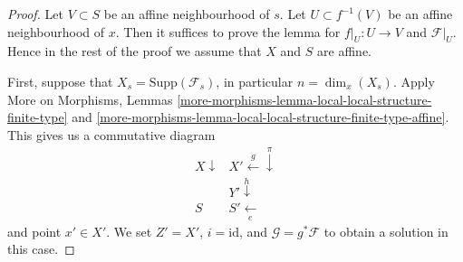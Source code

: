 \begin{proof}

Let $V \subset S$ be an affine neighbourhood of $s$.
Let $U \subset f^{-1}(V)$ be an affine neighbourhood of $x$.
Then it suffices to prove the lemma for $f|_U : U \to V$ and
$\mathcal{F}|_U$. Hence in the rest of the proof we assume that
$X$ and $S$ are affine.

\medskip\noindent
First, suppose that $X_s = \text{Supp}(\mathcal{F}_s)$, in particular
$n = \dim_x(X_s)$. Apply
More on Morphisms,
Lemmas \ref{more-morphisms-lemma-local-local-structure-finite-type} and
\ref{more-morphisms-lemma-local-local-structure-finite-type-affine}.
This gives us a commutative diagram
$$
\begin{array}{cc}X \downarrow & X' \overset{g}{\longleftarrow}\overset{\pi}{\downarrow} \\  & Y' \overset{h}{\downarrow} \\ S & S' \underset{e}{\longleftarrow}\end{array}
$$
and point $x' \in X'$. We set $Z' = X'$, $i = \text{id}$, and
$\mathcal{G} = g^*\mathcal{F}$ to obtain a solution in this case.


\end{proof}
